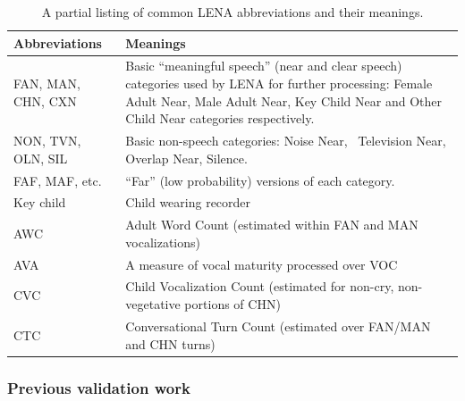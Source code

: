 \documentclass[english,floatsintext,man]{apa6}
\begin{document}
\begin{table}[t]

\caption{\label{tab:tab-abb}A partial listing of common LENA abbreviations and their meanings.}
\centering
\begin{tabular}{>{\raggedright\arraybackslash}p{10em}>{\raggedright\arraybackslash}p{30em}}
\toprule
Abbreviations & Meanings\\
\midrule
FAN, MAN, CHN, CXN & Basic “meaningful speech” (near and clear speech) categories used by LENA for further processing: Female Adult Near, Male Adult Near, Key Child Near and Other Child Near categories respectively.\\
NON, TVN, OLN, SIL & Basic non-speech categories: Noise Near,  Television Near, Overlap Near, Silence.\\
FAF, MAF, etc. & “Far” (low probability) versions of each category.\\
Key child & Child wearing recorder\\
AWC & Adult Word Count (estimated within FAN and MAN vocalizations)\\
\addlinespace
AVA & A measure of vocal maturity processed over VOC\\
CVC & Child Vocalization Count (estimated for non-cry, non-vegetative portions of CHN)\\
CTC & Conversational Turn Count (estimated over FAN/MAN and CHN turns)\\
\bottomrule
\end{tabular}
\end{table}

\subsubsection{Previous validation work}\label{previous-validation-work}
\end{document}
